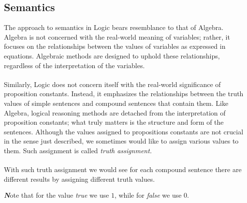 \documentclass[10pt,a4pape,twocolumn]{article}
\newenvironment{callout}
	{\begin{calloutbox}\color{charcoal}\textbf\textit}
	{\end{calloutbox}}
\begin{document}
            \subsection{Semantics}
                The approach to semantics in Logic bears resemblance to that of Algebra. Algebra is not concerned with the real-world meaning of variables; rather, it focuses on the relationships between the values of variables as expressed in equations. Algebraic methods are designed to uphold these relationships, regardless of the interpretation of the variables.
                \\
                \\
                Similarly, Logic does not concern itself with the real-world significance of proposition constants. Instead, it emphasizes the relationships between the truth values of simple sentences and compound sentences that contain them. Like Algebra, logical reasoning methods are detached from the interpretation of proposition constants; what truly matters is the structure and form of the sentences. Although the values assigned to propositions constants are not crucial in the sense just described, we sometimes would like to assign various values to them. Such assignment is called \textit{truth assignment.}
                \\
                \\
                With such truth assignment we would see for each compound sentence there are different results by assigning different truth values.
                \begin{callout}
                    Note that for the value \textit{true} we use $1$, while for \textit{false} we use $0$.
                \end{callout}
\end{document}

